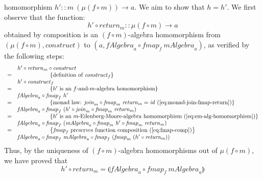 \documentclass{jfp1}
\newcommand{\fold}[1]{\llparenthesis #1 \rrparenthesis}
\newcommand{\eqAnnotation}[1]{\hspace{2cm}\left\{\textrm{#1}\right\}}
\begin{document}
\begin{proof*}
\begin{enumerate}
    homomorphism $h' :: m~(\mu(f \circ m)) \to a$. We aim to show that
    $h = h'$. We first observe that the function:
    \begin{displaymath}
      h' \circ \mathit{return}_m :: \mu(f \circ m) \to a
    \end{displaymath}
    obtained by composition is an $(f \circ m)$-algebra homomorphism
    from $(\mu(f \circ m), \mathit{construct})$ to $(a, \mathit{fAlgebra}_a
    \circ \mathit{fmap}_f~\mathit{mAlgebra}_a)$, as verified by the
    following steps:
    \begin{displaymath}
      \begin{array}{cl}
        & h' \circ \mathit{return}_m \circ \mathit{construct} \\
        =&\eqAnnotation{definition of $\mathit{construct}_f$} \\
        & h' \circ \mathit{construct}_f \\
        =&\eqAnnotation{$h'$ is an $f$-and-$m$-algebra homomorphism} \\
        & \mathit{fAlgebra}_a \circ \mathit{fmap}_f~h' \\
        =&\eqAnnotation{monad law: $\mathit{join}_m \circ \mathit{fmap}_m~\mathit{return}_m = \mathit{id}$ (\autoref{eq:monad-join-fmap-return})} \\
        & \mathit{fAlgebra}_a \circ \mathit{fmap}_f~(h' \circ \mathit{join}_m \circ \mathit{fmap}_m~\mathit{return}_m) \\
        =&\eqAnnotation{$h'$ is an $m$-Eilenberg-Moore-algebra homomorphism (\autoref{eq:em-alg-homomorphism})} \\
        & \mathit{fAlgebra}_a \circ \mathit{fmap}_f~(\mathit{mAlgebra}_a \circ \mathit{fmap}_m~h' \circ \mathit{fmap}_m~\mathit{return}_m) \\
        =&\eqAnnotation{$\mathit{fmap}_f$ preserves function composition (\autoref{eq:fmap-comp})} \\
        & \mathit{fAlgebra}_a \circ \mathit{fmap}_f~\mathit{mAlgebra}_a \circ \mathit{fmap}_f~(\mathit{fmap}_m~(h' \circ \mathit{return}_m))
      \end{array}
    \end{displaymath}
    Thus, by the uniqueness of $(f \circ m)$-algebra homomorphisms out
    of $\mu(f \circ m)$, we have proved that 
    \begin{equation}\label{eq:h'-prop}
      h' \circ \mathit{return}_m = \fold{\mathit{fAlgebra}_a \circ \mathit{fmap}_f~\mathit{mAlgebra}_a}
    \end{equation}

\end{enumerate}
\end{proof*}
\end{document}
